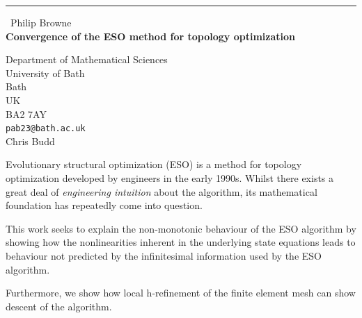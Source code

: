 \documentclass{report}
\begin{document}
\begin{center}
\rule{6in}{1pt} \
{\large Philip Browne \\
{\bf Convergence of the ESO method for topology optimization}}

Department of Mathematical Sciences \\ University of Bath \\ Bath \\ UK \\ BA2 7AY
\\
{\tt pab23@bath.ac.uk}\\
Chris Budd\end{center}

Evolutionary structural optimization (ESO) is a method for topology
optimization developed by engineers in the early 1990s. Whilst there
exists a great deal of \textit{engineering intuition} about the
algorithm, its mathematical foundation has repeatedly come into question.

This work seeks to explain the non-monotonic behaviour of the ESO
algorithm by showing how the nonlinearities inherent in the underlying
state equations leads to behaviour not predicted by the infinitesimal
information used by the ESO algorithm.

Furthermore, we show how local h-refinement of the finite element mesh
can show descent of the algorithm.
\end{document}
